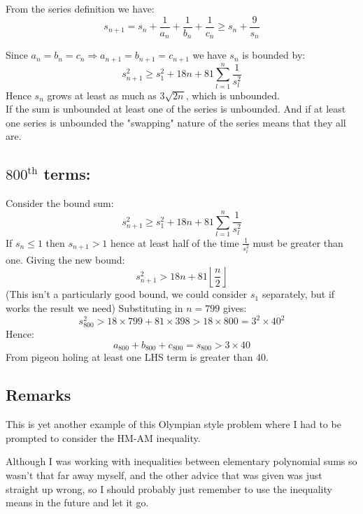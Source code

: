From the series definition we have:
\[s_{n+1} = s_n + \frac{1}{a_n}+\frac{1}{b_n}+\frac{1}{c_n} \geq s_n+\frac{9}{s_n}\]

Since $a_n=b_n=c_n \Rightarrow a_{n+1}=b_{n+1}=c_{n+1}$ we have $s_n$ is bounded by:
\[ s_{n+1}^2 \geq s_1^2+18n+81\sum_{l=1}^n\frac{1}{s_l^2}\]
Hence $s_n$ grows at least as much as $3\sqrt{2n}$,
which is unbounded.
\\

If the sum is unbounded at least one of the series is unbounded.
And if at least one series is unbounded the "swapping" nature of the series means that they all are.

\subsection{$800^\text{th}$ terms:}
Consider the bound sum:
\[ s_{n+1}^2 \geq s_1^2+18n+81\sum_{l=1}^n\frac{1}{s_l^2}\]
If $s_n \leq 1$ then $s_{n+1} > 1$ hence at least half of the time $\frac{1}{s_l^2}$ must be greater than one.
Giving the new bound:
\[ s_{n+1}^2 > 18n+81\left\lfloor\frac{n}{2}\right\rfloor\]
(This isn't a particularly good bound, we could consider $s_1$ separately, but if works the result we need)
Substituting in $n=799$ gives:
\[s_{800}^2 > 18\times799+81\times398 > 18\times800 = 3^2\times40^2\]
Hence:
\[a_{800}+b_{800}+c_{800} = s_{800} > 3\times40\]
From pigeon holing at least one LHS term is greater than 40.

\subsection{Remarks}
This is yet another example of this Olympian style problem where I had to be prompted to consider the HM-AM inequality.

Although I was working with inequalities between elementary polynomial sums so wasn't that far away myself,
and the other advice that was given was just straight up wrong, 
so I should probably just remember to use the inequality means in the future and let it go.

